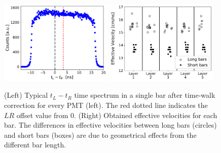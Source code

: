 \documentclass[3p,final,twocolumn]{elsarticle}
\begin{document}
\begin{figure}[tb]
	\centering
		\includegraphics[width=0.48\textwidth]{lr-offset.pdf}
		\includegraphics[width=0.48\textwidth]{eff_vel.pdf}
	\caption{
	(Left) Typical $t_{L} - t_{R}$ time spectrum in a single bar after time-walk correction for every PMT (left). The red dotted line indicates the $LR$ offset value from 0. (Right) Obtained effective velocities for each bar. The differences in effective velocities between long bars (circles) and short bars (boxes) are due to geometrical effects from the different bar length.}
	\label{fig:eff_vel}
\end{figure}

\end{document}
